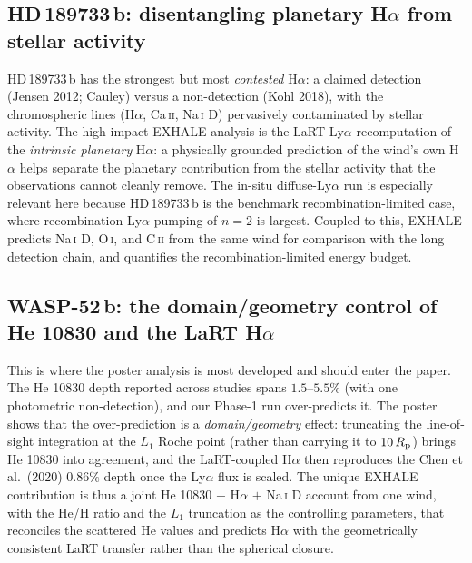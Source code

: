 \subsection{HD\,189733\,b: disentangling planetary H$\alpha$ from stellar activity}
HD\,189733\,b has the strongest but most \emph{contested} H$\alpha$: a claimed
detection (Jensen 2012; Cauley) versus a non-detection (Kohl 2018), with the
chromospheric lines (H$\alpha$, Ca\,\textsc{ii}, Na\,\textsc{i} D) pervasively
contaminated by stellar activity. The high-impact EXHALE analysis is the LaRT
Ly$\alpha$ recomputation of the \emph{intrinsic planetary} H$\alpha$: a physically
grounded prediction of the wind's own H$\alpha$ helps separate the planetary
contribution from the stellar activity that the observations cannot cleanly
remove. The in-situ diffuse-Ly$\alpha$ run is especially relevant here because
HD\,189733\,b is the benchmark recombination-limited case, where recombination
Ly$\alpha$ pumping of $n=2$ is largest. Coupled to this, EXHALE predicts Na\,\textsc{i}
D, O\,\textsc{i}, and C\,\textsc{ii} from the same wind for comparison with the
long detection chain, and quantifies the recombination-limited energy budget.

\subsection{WASP-52\,b: the domain/geometry control of He 10830 and the LaRT H$\alpha$}
This is where the poster analysis is most developed and should enter the paper.
The He 10830 depth reported across studies spans $1.5$--$5.5\%$ (with one
photometric non-detection), and our Phase-1 run over-predicts it. The poster shows
that the over-prediction is a \emph{domain/geometry} effect: truncating the
line-of-sight integration at the $L_1$ Roche point (rather than carrying it to
$10\,R_{\rm p}$) brings He 10830 into agreement, and the LaRT-coupled H$\alpha$
then reproduces the Chen et al.\ (2020) $0.86\%$ depth once the Ly$\alpha$ flux is
scaled. The unique EXHALE contribution is thus a joint He 10830 $+$ H$\alpha$ $+$
Na\,\textsc{i} D account from one wind, with the He/H ratio and the $L_1$
truncation as the controlling parameters, that reconciles the scattered He values
and predicts H$\alpha$ with the geometrically consistent LaRT transfer rather than
the spherical closure.

